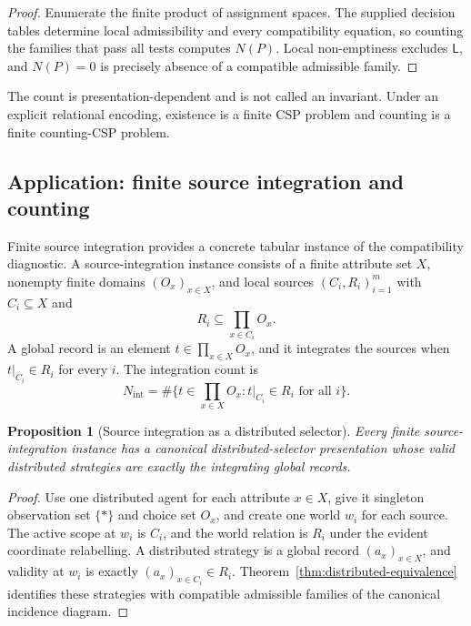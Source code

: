 \documentclass[11pt]{article}
\theoremstyle{plain}
\newtheorem{proposition}[theorem]{Proposition}
\theoremstyle{definition}
\theoremstyle{remark}
\begin{document}
\begin{proof}
Enumerate the finite product of assignment spaces. The supplied decision tables
determine local admissibility and every compatibility equation, so counting the
families that pass all tests computes $N(P)$. Local non-emptiness excludes
$\mathsf L$, and $N(P)=0$ is precisely absence of a compatible admissible family.
\end{proof}

The count is presentation-dependent and is not called an invariant. Under an
explicit relational encoding, existence is a finite CSP problem and counting is
a finite counting-CSP problem.

\subsection{Application: finite source integration and counting}
\label{subsec:source-integration}

Finite source integration provides a concrete tabular instance of the
compatibility diagnostic. A source-integration instance consists of a finite
attribute set $X$, nonempty finite domains $(O_x)_{x\in X}$, and local sources
$(C_i,R_i)_{i=1}^m$ with $C_i\subseteq X$ and
\[
R_i\subseteq\prod_{x\in C_i}O_x.
\]
A global record is an element $t\in\prod_{x\in X}O_x$, and it integrates the
sources when $t|_{C_i}\in R_i$ for every $i$. The integration count is
\[
N_{\mathrm{int}}=\#\{t\in\prod_{x\in X}O_x:t|_{C_i}\in R_i\text{ for all }i\}.
\]

\begin{proposition}[Source integration as a distributed selector]
\label{prop:source-integration-distributed}
Every finite source-integration instance has a canonical distributed-selector
presentation whose valid distributed strategies are exactly the integrating
global records.
\end{proposition}

\begin{proof}
Use one distributed agent for each attribute $x\in X$, give it singleton
observation set $\{\ast\}$ and choice set $O_x$, and create one world $w_i$ for
each source. The active scope at $w_i$ is $C_i$, and the world relation is
$R_i$ under the evident coordinate relabelling. A distributed strategy is a
global record $(a_x)_{x\in X}$, and validity at $w_i$ is exactly
$(a_x)_{x\in C_i}\in R_i$. Theorem~\ref{thm:distributed-equivalence} identifies
these strategies with compatible admissible families of the canonical incidence
diagram.
\end{proof}
\end{document}
